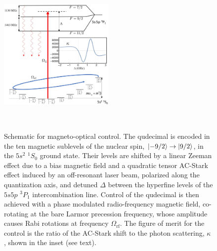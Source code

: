 \documentclass[aps,prl,twocolumn,reprint,superscriptaddress,footinbib]{revtex4-2}
\begin{document}
\begin{figure}

\includegraphics[width=0.5\textwidth, height=8cm]{animation.eps}
\caption{  Schematic for magneto-optical control.  The qudecimal is encoded in the ten magnetic sublevels of the nuclear spin, $\ket{-9/2}\rightarrow \ket{9/2}$, in the $5s^2$ $^1S_0$ ground state. Their levels are shifted by a linear Zeeman effect due to a bias magnetic field and a quadratic tensor AC-Stark effect induced by an off-resonant laser beam, polarized along the quantization axis, and detuned $\Delta$ between the hyperfine levels of the $5s5p$ $^3P_1$ intercombination line.  Control of the qudecimal is then achieved with a phase modulated radio-frequency magnetic field, co-rotating at the bare Larmor precession frequency, whose amplitude causes Rabi rotations at frequency $\Omega_{\mathrm{rf}}$. The figure of merit for the control is the ratio of the AC-Stark shift to the photon scattering, $\kappa$ , shown in the inset (see text).}
\label{fig:level_diagram_strontium}
\end{figure}
\end{document}
